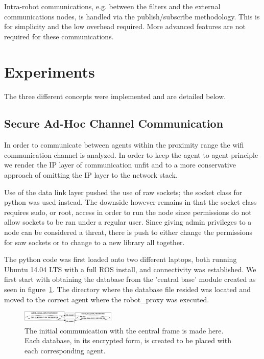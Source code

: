\documentclass[conference]{IEEEtran}
\begin{document}
Intra-robot communications, e.g. between the filters and the external communications nodes, is handled via the publish/subscribe methodology. This is for simplicity and the low overhead required. More advanced features are not required for these communications.

\section{Experiments}

The three different concepts were implemented and are detailed below.

\subsection{Secure Ad-Hoc Channel Communication}

In order to communicate between agents within the proximity range the wifi communication channel is analyzed. In order to keep the agent to agent principle we render the IP layer of communication unfit and to a more conservative approach of omitting the IP layer to the network stack.

Use of the data link layer pushed the use of raw sockets; the socket class for python was used instead. The downside however remains in that the socket class requires sudo, or root, access in order to run the node since permissions do not allow sockets to be ran under a regular user. Since giving admin privileges to a node can be considered a threat, there is push to either change the permissions for saw sockets or to change to a new library all together.

The python code was first loaded onto two different laptops, both running Ubuntu 14.04 LTS with a full ROS install, and connectivity was established. We first start with obtaining the database from the 'central base' module created as seen in figure~\ref{fig:TopicIntr1}. The directory where the database file resided was located and moved to the correct agent where the robot\_proxy was executed.

\begin{figure}[]
\centering
\includegraphics[width=0.4\textwidth]{TopicIntr1}
\caption{The initial communication with the central frame is made here. Each database, in its encrypted form, is created to be placed with each corresponding agent.}
\label{fig:TopicIntr1}
\end{figure}
\end{document}
